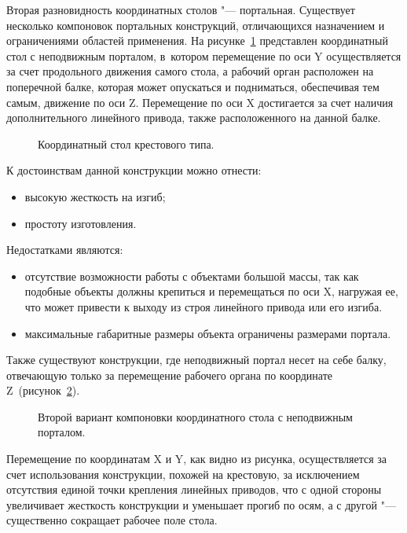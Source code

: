 Вторая разновидность координатных столов "--- портальная. Существует несколько компоновок портальных конструкций, отличающихся назначением и ограничениями областей применения. На рисунке~\cref{fig:coord-1} представлен координатный стол с неподвижным порталом, в~котором перемещение по оси Y осуществляется за счет продольного движения самого стола, а рабочий орган расположен на поперечной балке, которая может опускаться и подниматься, обеспечивая тем самым, движение по оси Z. Перемещение по оси X достигается за счет наличия дополнительного линейного привода, также расположенного на данной балке.

\begin{figure}[ht]
	\caption{Координатный стол крестового типа.}\label{fig:coord-1}
\end{figure}

К достоинствам данной конструкции можно отнести:

\begin{itemize}
	\item высокую жесткость на изгиб;
	
	\item простоту изготовления.
\end{itemize}

Недостатками являются:

\begin{itemize}
	\item отсутствие возможности работы с объектами большой массы, так как подобные объекты должны крепиться и перемещаться по оси X, нагружая ее, что может привести к выходу из строя линейного привода или его изгиба.
	
	\item максимальные габаритные размеры объекта ограничены размерами портала.	
\end{itemize}

Также существуют конструкции, где неподвижный портал несет на себе балку, отвечающую только за перемещение рабочего органа по координате Z~(рисунок~\cref{fig:coord-2}).

\begin{figure}[ht]
	\caption{Второй вариант компоновки координатного стола с неподвижным порталом.}\label{fig:coord-2}
\end{figure}

Перемещение по координатам X и Y, как видно из рисунка, осуществляется за счет использования конструкции, похожей на крестовую, за исключением отсутствия единой точки крепления линейных приводов, что с одной стороны увеличивает жесткость конструкции и уменьшает прогиб по осям, а с другой "--- существенно сокращает рабочее поле стола.

